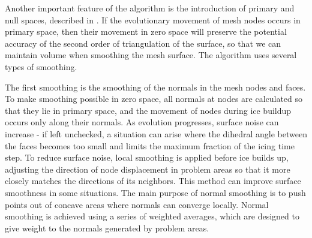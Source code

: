 \documentclass[
11pt,%
tightenlines,%
twoside,%
onecolumn,%
nofloats,%
nobibnotes,%
nofootinbib,%
superscriptaddress,%
noshowpacs,%
centertags]%
{revtex4}
\begin{document}
Another important feature of the algorithm is the introduction of primary and null spaces, described in \cite{Jiao_null_space_smooth}.
If the evolutionary movement of mesh nodes occurs in primary space, then their movement in zero space will preserve the potential accuracy of the second order of triangulation of the surface, so that we can maintain volume when smoothing the mesh surface.
The algorithm uses several types of smoothing.

The first smoothing is the smoothing of the normals in the mesh nodes and faces.
To make smoothing possible in zero space, all normals at nodes are calculated so that they lie in primary space, and the movement of nodes during ice buildup occurs only along their normals.
As evolution progresses, surface noise can increase - if left unchecked, a situation can arise where the dihedral angle between the faces becomes too small and limits the maximum fraction of the icing time step.
To reduce surface noise, local smoothing is applied before ice builds up, adjusting the direction of node displacement in problem areas so that it more closely matches the directions of its neighbors.
This method can improve surface smoothness in some situations.
The main purpose of normal smoothing is to push points out of concave areas where normals can converge locally.
Normal smoothing is achieved using a series of weighted averages, which are designed to give weight to the normals generated by problem areas.
\end{document}
